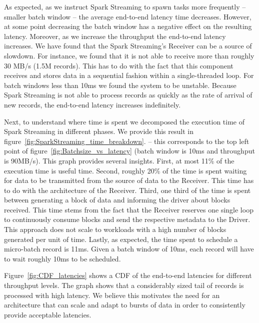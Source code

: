 As expected, as we instruct Spark Streaming to spawn tasks more frequently -- smaller batch window -- the average end-to-end latency time decreases.
However, at some point decreasing the batch window has a negative effect on the resulting latency.
Moreover, as we increase the throughput the end-to-end latency increases.
We have found that the Spark Streaming's Receiver can be a source of slowdown.
For instance, we found that it is not able to receive more than roughly 30 MB/s (1.5M records).
This has to do with the fact that this component receives and stores data in a sequential fashion within a single-threaded loop.
For batch windows less than 10ms we found the system to be unstable. 
Because Spark Streaming is not able to process records as quickly as the rate of arrival of new records, the end-to-end latency increases indefinitely.

Next, to understand where time is spent we decomposed the execution time of Spark Streaming in different phases.
We provide this result in figure~\ref{fig:SparkStreaming_time_breakdown}. 
-- this corresponds to the top left point of figure~\ref{fig:Batchsize_vs_latency} (batch window is 10ms and throughput is 90MB/s).
This graph provides several insights. 
First, at most 11\% of the execution time is useful time.
Second, roughly 20\% of the time is spent waiting for data to be transmitted from the source of data to the Receiver.
This time has to do with the architecture of the Receiver.
Third, one third of the time is spent between generating a block of data and informing the driver about blocks received.
This time stems from the fact that the Receiver reserves one single loop to continuously consume blocks and send the respective metadata to the Driver.
This approach does not scale to workloads with a high number of blocks generated per unit of time.
Lastly, as expected, the time spent to schedule a micro-batch record is 11ms. Given a batch window of 10ms, each record will have to wait roughly 10ms to be scheduled.

Figure~\ref{fig:CDF_latencies} shows a CDF of the end-to-end latencies for different throughput levels. The graph shows that a considerably sized tail of records is processed with high latency.
We believe this motivates the need for an architecture that can scale and adapt to bursts of data in order to consistently provide acceptable latencies.
